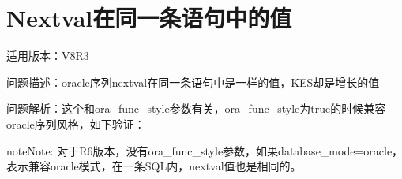 \documentclass[a4,10pt,oneside,english]{sphinxmanual}
\begin{document}
\section{Nextval在同一条语句中的值}
\label{\detokenize{sql:nextval}}
适用版本：V8R3

问题描述：oracle序列nextval在同一条语句中是一样的值，KES却是增长的值

问题解析：这个和ora\_func\_style参数有关，ora\_func\_style为true的时候兼容oracle序列风格，如下验证：

\begin{sphinxVerbatim}[commandchars=\\\{\}]
 

   
           
 

   
           
 
\end{sphinxVerbatim}

\begin{sphinxadmonition}{note}{Note:}
对于R6版本，没有ora\_func\_style参数，如果database\_mode=oracle，表示兼容oracle模式，在一条SQL内，nextval值也是相同的。
\end{sphinxadmonition}
\end{document}
